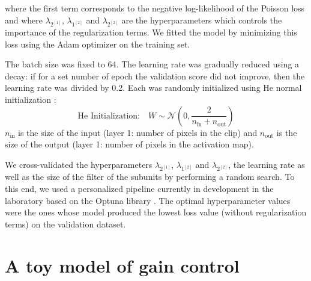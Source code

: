 where the first term corresponds to the negative
log-likelihood of the Poisson loss and where $\lambda_{2^{[1]}} $,
$\lambda_{1^{[2]}}$ and $\lambda_{2^{[2]}}$ are the hyperparameters
which controls the importance of the regularization terms. We
fitted the model by minimizing this loss using the Adam optimizer on the
training set.

The batch size was fixed to 64.
The learning rate was gradually reduced using a decay: if for a set number of
epoch the validation score did not improve, then the learning rate was divided
by 0.2.
Each was randomly initialized using He normal initialization :
\[
    \text{He Initialization:} \quad W \sim \mathcal{N}\left(0,
    \frac{2}{n_{\text{in}} + n_{\text{out}}}\right)
\]
$n_{\text{in}}$ is the size of the input (layer 1: number of pixels in the
clip) and $n_{\text{out}}$ is the size of the output (layer 1: number of pixels
in the
activation map).

We cross-validated the hyperparameters $\lambda_{2^{[1]}} $,
$\lambda_{1^{[2]}}$ and $\lambda_{2^{[2]}}$, the learning rate as well as the
size of the filter of the subunits
by performing a random search. To this end, we used a personalized pipeline
currently in development in the laboratory based on the Optuna library \cite{akiba_optuna_2019}. The optimal hyperparameter values were the ones
whose model produced the lowest loss value (without regularization terms) on
the validation dataset.

\section{A toy model of gain control}\label{app:toyModel}

